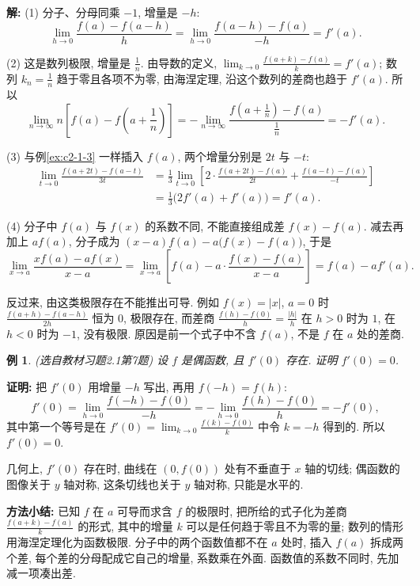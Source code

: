 \documentclass[UTF8,openany]{ctexbook}
\theoremstyle{chinesetextbook}
\newtheorem{example}{例}[section]
\newenvironment{cnproof}{\par\indent\textbf{证明:} \ignorespaces}{\par}
\newenvironment{cnsolution}{\par\indent\textbf{解:} \ignorespaces}{\par}
\begin{document}
\begin{cnsolution}
(1) 分子、分母同乘 $-1$, 增量是 $-h$:
\[
\lim_{h\to0}\frac{f(a)-f(a-h)}h=\lim_{h\to0}\frac{f(a-h)-f(a)}{-h}=f'(a).
\]

(2) 这是数列极限, 增量是 $\displaystyle\frac1n$. 由导数的定义, $\displaystyle\lim_{k\to0}\frac{f(a+k)-f(a)}k=f'(a)$; 数列 $\displaystyle k_n=\frac1n$ 趋于零且各项不为零, 由海涅定理, 沿这个数列的差商也趋于 $f'(a)$. 所以
\[
\lim_{n\to\infty}n\left[f(a)-f\left(a+\frac1n\right)\right]=-\lim_{n\to\infty}\frac{f\left(a+\frac1n\right)-f(a)}{\frac1n}=-f'(a).
\]

(3) 与例\ref{ex:c2-1-3} 一样插入 $f(a)$, 两个增量分别是 $2t$ 与 $-t$:
\[
\begin{aligned}
\lim_{t\to0}\frac{f(a+2t)-f(a-t)}{3t}&=\frac13\lim_{t\to0}\left[2\cdot\frac{f(a+2t)-f(a)}{2t}+\frac{f(a-t)-f(a)}{-t}\right]\\
&=\frac13\bigl(2f'(a)+f'(a)\bigr)=f'(a).
\end{aligned}
\]

(4) 分子中 $f(a)$ 与 $f(x)$ 的系数不同, 不能直接组成差 $f(x)-f(a)$. 减去再加上 $af(a)$, 分子成为 $(x-a)f(a)-a\bigl(f(x)-f(a)\bigr)$, 于是
\[
\lim_{x\to a}\frac{xf(a)-af(x)}{x-a}=\lim_{x\to a}\left[f(a)-a\cdot\frac{f(x)-f(a)}{x-a}\right]=f(a)-af'(a).
\]
\end{cnsolution}
反过来, 由这类极限存在不能推出可导. 例如 $f(x)=|x|$, $a=0$ 时 $\displaystyle\frac{f(a+h)-f(a-h)}{2h}$ 恒为 $0$, 极限存在, 而差商 $\displaystyle\frac{f(h)-f(0)}h=\frac{|h|}h$ 在 $h>0$ 时为 $1$, 在 $h<0$ 时为 $-1$, 没有极限. 原因是前一个式子中不含 $f(a)$, 不是 $f$ 在 $a$ 处的差商.
\begin{example}\label{ex:c2-h1-7}
\textnormal{(选自教材习题2.1第7题)} 设 $f$ 是偶函数, 且 $f'(0)$ 存在. 证明 $f'(0)=0$.
\end{example}
\begin{cnproof}
把 $f'(0)$ 用增量 $-h$ 写出, 再用 $f(-h)=f(h)$:
\[
f'(0)=\lim_{h\to0}\frac{f(-h)-f(0)}{-h}=-\lim_{h\to0}\frac{f(h)-f(0)}h=-f'(0),
\]
其中第一个等号是在 $\displaystyle f'(0)=\lim_{k\to0}\frac{f(k)-f(0)}k$ 中令 $k=-h$ 得到的. 所以 $f'(0)=0$.
\end{cnproof}
几何上, $f'(0)$ 存在时, 曲线在 $(0,f(0))$ 处有不垂直于 $x$ 轴的切线; 偶函数的图像关于 $y$ 轴对称, 这条切线也关于 $y$ 轴对称, 只能是水平的.
\par\indent\textbf{方法小结:} 已知 $f$ 在 $a$ 可导而求含 $f$ 的极限时, 把所给的式子化为差商 $\displaystyle\frac{f(a+k)-f(a)}k$ 的形式, 其中的增量 $k$ 可以是任何趋于零且不为零的量; 数列的情形用海涅定理化为函数极限. 分子中的两个函数值都不在 $a$ 处时, 插入 $f(a)$ 拆成两个差, 每个差的分母配成它自己的增量, 系数乘在外面. 函数值的系数不同时, 先加减一项凑出差.
\end{document}
